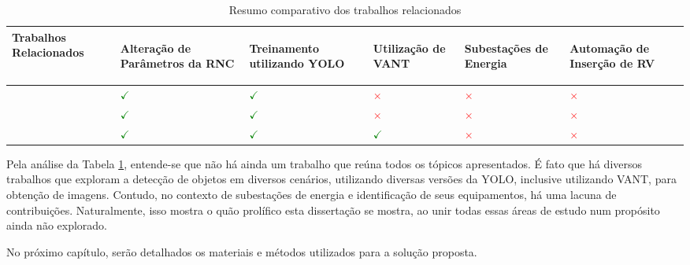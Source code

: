 \begin{table}[!hbt]
    \centering
    \caption{Resumo comparativo dos trabalhos relacionados}
    \begin{tabular}{ >{\centering\arraybackslash}m{5cm} | >{\centering\arraybackslash}m{2cm} | >{\centering\arraybackslash}m{2cm} | >{\centering\arraybackslash}m{2cm} | >{\centering\arraybackslash}m{2cm} | >{\centering\arraybackslash}m{2cm} }
    \hline
    \cellcolor[gray]{0.9} \textbf{Trabalhos Relacionados} & 
    \cellcolor[gray]{0.9} \begin{sideways} \textbf{Alteração de Parâmetros da RNC} \end{sideways} & 
    \cellcolor[gray]{0.9} \begin{sideways} \textbf{Treinamento utilizando YOLO} \end{sideways} & 
    \cellcolor[gray]{0.9} \begin{sideways} \textbf{Utilização de VANT} \end{sideways} & 
    \cellcolor[gray]{0.9} \begin{sideways} \textbf{Subestações de Energia} \end{sideways} &
    \cellcolor[gray]{0.9} \begin{sideways} \textbf{Automação de Inserção de RV} \end{sideways} \\
    \hline 
    \cite{gonzaga2023identificaccao} & \textcolor{green}{\(\checkmark\)} & \textcolor{green}{\(\checkmark\)} & \textcolor{red}{\(\times\)} & \textcolor{red}{\(\times\)} & \textcolor{red}{\(\times\)} \\
    \hline
    \cite{diascomparaccao} & \textcolor{green}{\(\checkmark\)} & \textcolor{green}{\(\checkmark\)} & \textcolor{red}{\(\times\)} & \textcolor{red}{\(\times\)} & \textcolor{red}{\(\times\)} \\
    \hline
    \cite{wang2023uav} & \textcolor{green}{\(\checkmark\)} & \textcolor{green}{\(\checkmark\)} & \textcolor{green}{\(\checkmark\)} & \textcolor{red}{\(\times\)} & \textcolor{red}{\(\times\)} \\
    \end{tabular}
    \label{tab:relacionado1}
\end{table}

Pela análise da Tabela \ref{tab:relacionado1}, entende-se que não há ainda um trabalho que reúna todos os tópicos apresentados. É fato que há diversos trabalhos que exploram a detecção de objetos em diversos cenários, utilizando diversas versões da YOLO, inclusive utilizando VANT, para obtenção de imagens. Contudo, no contexto de subestações de energia e identificação de seus equipamentos, há uma lacuna de contribuições. Naturalmente, isso mostra o quão prolífico esta dissertação se mostra, ao unir todas essas áreas de estudo num propósito ainda não explorado.

No próximo capítulo, serão detalhados os materiais e métodos utilizados para a solução proposta.
















